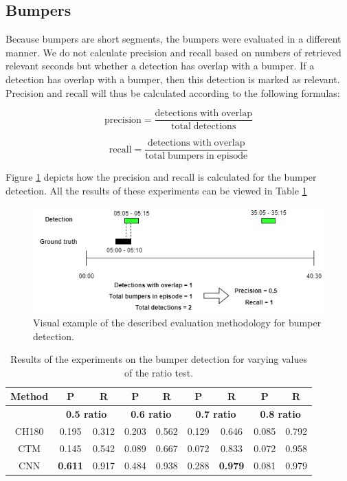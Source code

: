 \documentclass{article}
\begin{document}
\subsection{Bumpers}
Because bumpers are short segments, the bumpers were evaluated in a different manner. We do not calculate precision and recall based on numbers of retrieved relevant seconds but whether a detection has overlap with a bumper. If a detection has overlap with a bumper, then this detection is marked as relevant. Precision and recall will thus be calculated according to the following formulas:

\[\mathrm{precision} = \frac{\mathrm{detections\;with\;overlap}}{\mathrm{total\;detections}}\]

\[\mathrm{recall} = \frac{\mathrm{detections\;with\;overlap}}{\mathrm{total\;bumpers\;in\;episode}}\]

Figure \ref{fig:evaluation-example-bumpers} depicts how the precision and recall is calculated for the bumper detection. All the results of these experiments can be viewed in Table \ref{table:resultsbumpers}

\begin{figure}[H]
	\includegraphics[width=\textwidth]{images/evaluation-bumpers.png}
	\centering
	\caption{Visual example of the described evaluation methodology for bumper detection.}
	\label{fig:evaluation-example-bumpers}
\end{figure}

\begin{table}[H]
	\begin{center}
		\begin{tabular}{ c c c c c c c c c} 
			\hline
			\textbf{Method} & \textbf{P} & \textbf{R} & \textbf{P} & \textbf{R} & \textbf{P} & \textbf{R} & \textbf{P} & \textbf{R} \\
			\hline
			& \multicolumn{2}{c}{\textbf{0.5 ratio}} & \multicolumn{2}{c}{\textbf{0.6 ratio}} & \multicolumn{2}{c}{\textbf{0.7 ratio}} & \multicolumn{2}{c}{\textbf{0.8 ratio}} \\
			\hline
			CH180 			& 0.195				& 0.312 		& 0.203		& 0.562		& 0.129		& 0.646 	& 0.085 	& 0.792 \\
			CTM 			&  0.145			& 0.542 		& 0.089		& 0.667 	& 0.072		& 0.833 	& 0.072 	& 0.958 \\
			CNN 			& \textbf{0.611}	& 0.917			& 0.484		& 0.938 	& 0.288		& \textbf{0.979} 	& 0.081 	& 0.979 \\
			\hline
		\end{tabular}
	\end{center}
	\caption{Results of the experiments on the bumper detection for varying values of the ratio test.}
	\label{table:resultsbumpers}
\end{table}
\end{document}
